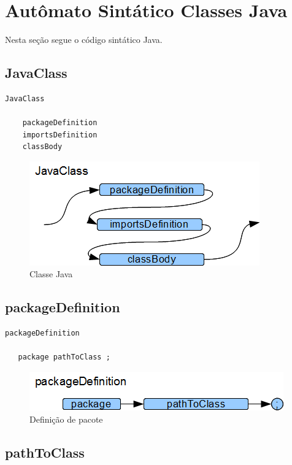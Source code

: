 \section{Autômato Sintático Classes Java}

Nesta seção segue o código sintático Java.

\subsection{JavaClass}

\begin{lstlisting}
JavaClass

    packageDefinition
    importsDefinition
    classBody
\end{lstlisting}

\begin{figure}[h!]
 \centering
 \includegraphics{capitulo09/JavaClass.png}
 \caption{Classe Java}
\end{figure}
\subsection{packageDefinition}

\begin{lstlisting}
packageDefinition

   package pathToClass ;
\end{lstlisting}

\begin{figure}[h!]
 \centering
 \includegraphics{capitulo09/packageDefinition.png}
 \caption{Definição de pacote}
\end{figure}
\subsection{pathToClass}

